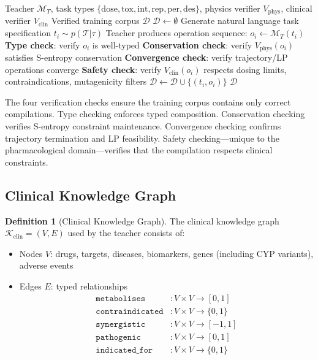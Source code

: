 \documentclass[11pt,twocolumn,a4paper]{article}
\theoremstyle{definition}
\newtheorem{definition}[theorem]{Definition}
\theoremstyle{remark}
\newcommand{\dataset}{\mathcal{D}}
\newcommand{\model}{\mathcal{M}}
\newcommand{\taskspace}{\mathcal{T}}
\begin{document}
\begin{algorithm}[H]
\caption{Clinical Distillation Corpus Generation}
\label{alg:clinical_distillation}
\begin{algorithmic}[1]
\REQUIRE Teacher $\model_T$, task types $\{\mathrm{dose}, \mathrm{tox}, \mathrm{int}, \mathrm{rep}, \mathrm{per}, \mathrm{des}\}$, physics verifier $V_{\mathrm{phys}}$, clinical verifier $V_{\mathrm{clin}}$
\ENSURE Verified training corpus $\dataset$
\STATE $\dataset \leftarrow \emptyset$
        \STATE Generate natural language task specification $t_i \sim p(\taskspace | \tau)$
        \STATE Teacher produces operation sequence: $o_i \leftarrow \model_T(t_i)$
        \STATE \textbf{Type check}: verify $o_i$ is well-typed
        \STATE \textbf{Conservation check}: verify $V_{\mathrm{phys}}(o_i)$ satisfies S-entropy conservation
        \STATE \textbf{Convergence check}: verify trajectory/LP operations converge
        \STATE \textbf{Safety check}: verify $V_{\mathrm{clin}}(o_i)$ respects dosing limits, contraindications, mutagenicity filters
            \STATE $\dataset \leftarrow \dataset \cup \{(t_i, o_i)\}$
        \ENDIF
    \ENDFOR
\ENDFOR
\RETURN $\dataset$
\end{algorithmic}
\end{algorithm}

The four verification checks ensure the training corpus contains only correct compilations. Type checking enforces typed composition. Conservation checking verifies S-entropy constraint maintenance. Convergence checking confirms trajectory termination and LP feasibility. Safety checking---unique to the pharmacological domain---verifies that the compilation respects clinical constraints.

\subsection{Clinical Knowledge Graph}

\begin{definition}[Clinical Knowledge Graph]
\label{def:clinical_kg}
The clinical knowledge graph $\mathcal{K}_\mathrm{clin} = (V, E)$ used by the teacher consists of:
\begin{itemize}[nosep,leftmargin=*]
\item Nodes $V$: drugs, targets, diseases, biomarkers, genes (including CYP variants), adverse events
\item Edges $E$: typed relationships
\begin{align}
\texttt{metabolises} &: V \times V \to [0, 1] \\
\texttt{contraindicated} &: V \times V \to \{0, 1\} \\
\texttt{synergistic} &: V \times V \to [-1, 1] \\
\texttt{pathogenic} &: V \times V \to [0, 1] \\
\texttt{indicated\_for} &: V \times V \to \{0, 1\}
\end{align}
\end{itemize}
\end{definition}
\end{document}
